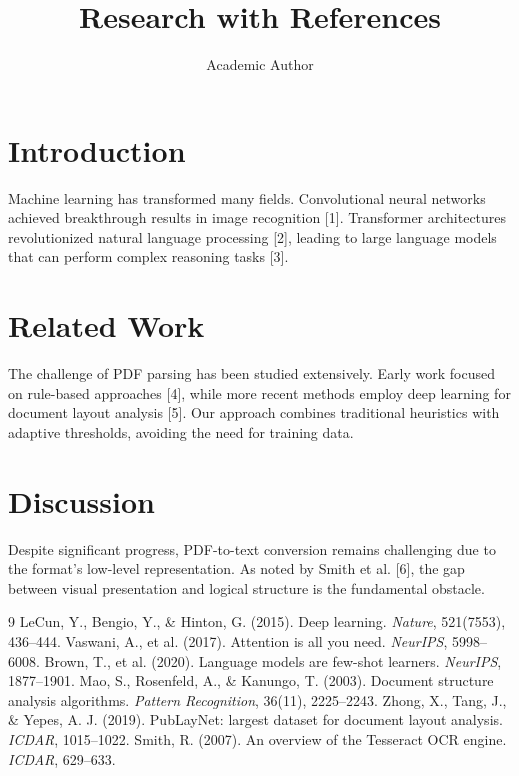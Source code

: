 \documentclass[12pt]{article}
\title{Research with References}
\author{Academic Author}
\begin{document}
\maketitle

\section{Introduction}
Machine learning has transformed many fields. Convolutional neural networks
achieved breakthrough results in image recognition [1]. Transformer architectures
revolutionized natural language processing [2], leading to large language models
that can perform complex reasoning tasks [3].

\section{Related Work}
The challenge of PDF parsing has been studied extensively. Early work focused on
rule-based approaches [4], while more recent methods employ deep learning for
document layout analysis [5]. Our approach combines traditional heuristics with
adaptive thresholds, avoiding the need for training data.

\section{Discussion}
Despite significant progress, PDF-to-text conversion remains challenging due to
the format's low-level representation. As noted by Smith et al. [6], the gap
between visual presentation and logical structure is the fundamental obstacle.

\begin{thebibliography}{9}
 LeCun, Y., Bengio, Y., \& Hinton, G. (2015). Deep learning. \textit{Nature}, 521(7553), 436--444.
 Vaswani, A., et al. (2017). Attention is all you need. \textit{NeurIPS}, 5998--6008.
 Brown, T., et al. (2020). Language models are few-shot learners. \textit{NeurIPS}, 1877--1901.
 Mao, S., Rosenfeld, A., \& Kanungo, T. (2003). Document structure analysis algorithms. \textit{Pattern Recognition}, 36(11), 2225--2243.
 Zhong, X., Tang, J., \& Yepes, A. J. (2019). PubLayNet: largest dataset for document layout analysis. \textit{ICDAR}, 1015--1022.
 Smith, R. (2007). An overview of the Tesseract OCR engine. \textit{ICDAR}, 629--633.
\end{thebibliography}
\end{document}
